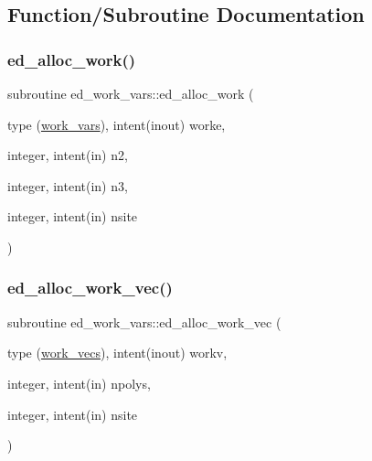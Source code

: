 \subsection{Function/\+Subroutine Documentation}
\mbox{\label{namespaceed__work__vars_a01ba1ac60fb7fc6120b2caa0044b3c21}} 
\subsubsection{\texorpdfstring{ed\+\_\+alloc\+\_\+work()}{ed\_alloc\_work()}}
{\footnotesize\ttfamily subroutine ed\+\_\+work\+\_\+vars\+::ed\+\_\+alloc\+\_\+work (\begin{DoxyParamCaption}\item[{type (\hyperlink{structed__work__vars_1_1work__vars}{work\+\_\+vars}), intent(inout)}]{worke,  }\item[{integer, intent(in)}]{n2,  }\item[{integer, intent(in)}]{n3,  }\item[{integer, intent(in)}]{nsite }\end{DoxyParamCaption})}

\mbox{\label{namespaceed__work__vars_a5df6efe6c5b192d365161ad999858f25}} 
\subsubsection{\texorpdfstring{ed\+\_\+alloc\+\_\+work\+\_\+vec()}{ed\_alloc\_work\_vec()}}
{\footnotesize\ttfamily subroutine ed\+\_\+work\+\_\+vars\+::ed\+\_\+alloc\+\_\+work\+\_\+vec (\begin{DoxyParamCaption}\item[{type (\hyperlink{structed__work__vars_1_1work__vecs}{work\+\_\+vecs}), intent(inout)}]{workv,  }\item[{integer, intent(in)}]{npolys,  }\item[{integer, intent(in)}]{nsite }\end{DoxyParamCaption})}

